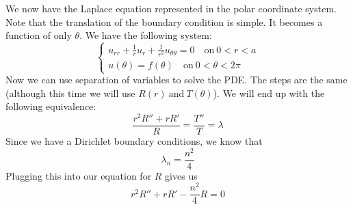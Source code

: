 \documentclass{article}
\begin{document}
We now have the Laplace equation represented in the polar coordinate system. Note that the translation of the boundary condition is simple. It becomes a function of only $\theta$. We have the following system:
\[
\begin{cases*}
u_{rr} + \frac{1}{r}u_{r} + \frac{1}{r^{2}}u_{\theta\theta} = 0\quad \text{on}\ 0 < r < a\\
u(\theta) = f(\theta)\quad \text{on}\ 0 < \theta < 2\pi
\end{cases*}
\]
Now we can use separation of variables to solve the PDE. The steps are the same (although this time we will use $R(r)\ \text{and}\ T(\theta)$). We will end up with the following equivalence:
\[
\frac{r^{2}R'' + rR'}{R} = \frac{T''}{T} = \lambda
\]
Since we have a Dirichlet boundary conditions, we know that
\[
\lambda_{n} = \frac{n^{2}}{4}
\]
Plugging this into our equation for $R$ gives us
\[
r^{2}R'' + rR' - \frac{n^{2}}{4}R = 0 
\]
\end{document}
